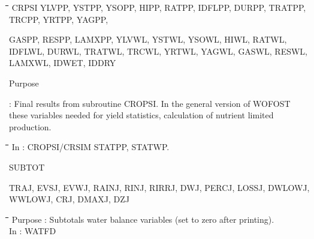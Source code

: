 \documentclass[11pt]{article}
\begin{document}
\nwln
\begin{tabbing}
\hspace{1.27cm}\=\hspace{1.27cm}\=\hspace{1.27cm}\=\hspace{1.27cm}\=%
\hspace{1.27cm}\=\hspace{1.27cm}\=\hspace{1.27cm}\=\hspace{1.27cm}\=%
\hspace{1.27cm}\=\hspace{1.27cm}\=\kill
CRPSI\>  YLVPP, YSTPP, YSOPP, HIPP, RATPP, IDFLPP, DURPP, TRATPP, TRCPP, YRTPP, YAGPP,
\end{tabbing}
GASPP, RESPP, LAMXPP, YLVWL, YSTWL, YSOWL, HIWL, RATWL, IDFLWL, DURWL,
TRATWL, TRCWL, YRTWL, YAGWL, GASWL, RESWL, LAMXWL, IDWET, IDDRY
\hspace*{1.28cm}
\testlastline

\begin{indenting}{2.54cm}
Purpose
\end{indenting}
\begin{indenting}{3.81cm}
: Final results from subroutine CROPSI. In the general version of WOFOST these variables 
  needed for yield statistics, calculation of nutrient limited production.
\end{indenting}
\begin{tabbing}
\hspace{1.27cm}\=\hspace{1.27cm}\=\hspace{1.27cm}\=\hspace{1.27cm}\=%
\hspace{1.27cm}\=\hspace{1.27cm}\=\hspace{1.27cm}\=\hspace{1.27cm}\=%
\hspace{1.27cm}\=\hspace{1.27cm}\=\kill
\>\> In : CROPSI/CRSIM STATPP, STATWP.
\end{tabbing}

\bigskip
SUBTOT
\testlastline

\begin{indenting}{2.54cm}
TRAJ, EVSJ, EVWJ, RAINJ, RINJ, RIRRJ, DWJ, PERCJ, LOSSJ, DWLOWJ, WWLOWJ, CRJ,
DMAXJ, DZJ
\end{indenting}
\begin{tabbing}
\hspace{1.27cm}\=\hspace{1.27cm}\=\hspace{1.27cm}\=\hspace{1.27cm}\=%
\hspace{1.27cm}\=\hspace{1.27cm}\=\hspace{1.27cm}\=\hspace{1.27cm}\=%
\hspace{1.27cm}\=\hspace{1.27cm}\=\kill
\>\> Purpose\> : Subtotals water balance variables (set to zero after printing).\\
\>\> In\> : WATFD
\end{tabbing}
\end{document}
